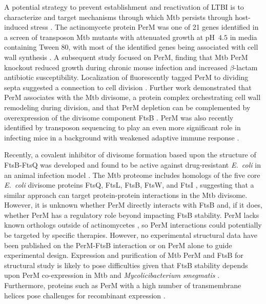 \documentclass[pdflatex,sn-nature]{sn-jnl}%
\newcommand\ec{\textit{E.~coli}}
\newcommand\mtb{Mtb}
\newcommand\msmegfull{\textit{Mycolicibacterium smegmatis}}
\begin{document}
A potential strategy to prevent establishment and reactivation of LTBI is to characterize and target mechanisms through which \mtb{} persists through host-induced stress \citep{dartoisAntituberculosisTreatmentStrategies2022}.
The actinomycete protein PerM was one of 21 genes identified in a screen of transposon \mtb{} mutants with attenuated growth at pH~$4.5$ in media containing Tween 80, with most of the identified genes being associated with cell wall synthesis \citep{vandalMembraneProteinPreserves2008}.
A subsequent study focused on PerM, finding that \mtb{} PerM knockout reduced growth during chronic mouse infection and increased $\beta$-lactam antibiotic susceptibility. Localization of fluorescently tagged PerM to dividing septa suggested a connection to cell division \citep{goodsmithDisruptionTuberculosisMembrane2015}.
Further work demonstrated that PerM associates with the \mtb{} divisome, a protein complex orchestrating cell wall remodeling during division, and that PerM depletion can be complemented by overexpression of the divisome component FtsB \citep{wangPersistentMycobacteriumTuberculosis2019}.
PerM was also recently identified by transposon sequencing to play an even more significant role in infecting mice in a background with weakened adaptive immune response \citep{meadeGenomewideScreenIdentifies2023}.

Recently, a covalent inhibitor of divisome formation based upon the structure of FtsB-FtsQ was developed and found to be active against drug-resistant \ec{} in an animal infection model \citep{paulussenCovalentProteomimeticInhibitor2022}.
The \mtb{} proteome includes homologs of the five core \ec{} divisome proteins FtsQ, FtsL, FtsB, FtsW, and FtsI \citep{wuCharacterizationConservedNovel2018}, suggesting that a similar approach can target protein-protein interactions in the \mtb{} divisome.
However, it is unknown whether PerM directly interacts with FtsB  \citep{wangPersistentMycobacteriumTuberculosis2019} and, if it does, whether PerM has a regulatory role beyond impacting FtsB stability.
PerM lacks known orthologs outside of actinomycetes \citep{goodsmithDisruptionTuberculosisMembrane2015}, so PerM interactions could potentially be targeted by specific therapies. However, no experimental structural data have been published on the PerM-FtsB interaction or on PerM alone to guide experimental design.
Expression and purification of \mtb{} PerM and FtsB for structural study is likely to pose difficulties given that FtsB stability depends upon PerM co-expression in \mtb{} and \msmegfull{} \citep{wangPersistentMycobacteriumTuberculosis2019}.
Furthermore, proteins such as PerM with a high number of transmembrane helices pose challenges for recombinant expression \citep{graveHighthroughputStrategyIdentification2022, korepanovaCloningExpressionMultiple2005}.
\end{document}
